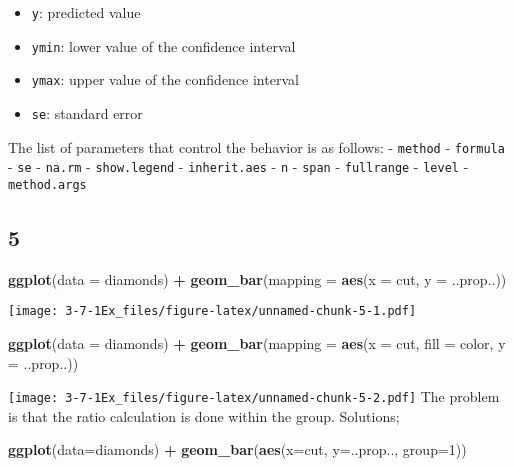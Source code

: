 \documentclass[]{article}
\newenvironment{Shaded}{\begin{snugshade}}{\end{snugshade}}
\newcommand{\DataTypeTok}[1]{\textcolor[rgb]{0.13,0.29,0.53}{#1}}
\newcommand{\DecValTok}[1]{\textcolor[rgb]{0.00,0.00,0.81}{#1}}
\newcommand{\KeywordTok}[1]{\textcolor[rgb]{0.13,0.29,0.53}{\textbf{#1}}}
\newcommand{\NormalTok}[1]{#1}
\newcommand{\OperatorTok}[1]{\textcolor[rgb]{0.81,0.36,0.00}{\textbf{#1}}}
\newcommand{\StringTok}[1]{\textcolor[rgb]{0.31,0.60,0.02}{#1}}
\providecommand{\tightlist}{%
  \setlength{\itemsep}{0pt}\setlength{\parskip}{0pt}}
\begin{document}
\begin{itemize}
\tightlist
\item
  \texttt{y}: predicted value
\item
  \texttt{ymin}: lower value of the confidence interval
\item
  \texttt{ymax}: upper value of the confidence interval
\item
  \texttt{se}: standard error
\end{itemize}

The list of parameters that control the behavior is as follows: -
\texttt{method} - \texttt{formula} - \texttt{se} - \texttt{na.rm} -
\texttt{show.legend} - \texttt{inherit.aes} - \texttt{n} - \texttt{span}
- \texttt{fullrange} - \texttt{level} - \texttt{method.args}

\hypertarget{section-5}{%
\subsection{5}\label{section-5}}

\begin{Shaded}
\begin{Highlighting}[]
\KeywordTok{ggplot}\NormalTok{(}\DataTypeTok{data =}\NormalTok{ diamonds) }\OperatorTok{+}\StringTok{ }
\StringTok{  }\KeywordTok{geom_bar}\NormalTok{(}\DataTypeTok{mapping =} \KeywordTok{aes}\NormalTok{(}\DataTypeTok{x =}\NormalTok{ cut, }\DataTypeTok{y =}\NormalTok{ ..prop..))}
\end{Highlighting}
\end{Shaded}

\texttt{[image: 3-7-1Ex\_files/figure-latex/unnamed-chunk-5-1.pdf]}

\begin{Shaded}
\begin{Highlighting}[]
\KeywordTok{ggplot}\NormalTok{(}\DataTypeTok{data =}\NormalTok{ diamonds) }\OperatorTok{+}\StringTok{ }
\StringTok{  }\KeywordTok{geom_bar}\NormalTok{(}\DataTypeTok{mapping =} \KeywordTok{aes}\NormalTok{(}\DataTypeTok{x =}\NormalTok{ cut, }\DataTypeTok{fill =}\NormalTok{ color, }\DataTypeTok{y =}\NormalTok{ ..prop..))}
\end{Highlighting}
\end{Shaded}

\texttt{[image: 3-7-1Ex\_files/figure-latex/unnamed-chunk-5-2.pdf]} The
problem is that the ratio calculation is done within the group.
Solutions;

\begin{Shaded}
\begin{Highlighting}[]
\KeywordTok{ggplot}\NormalTok{(}\DataTypeTok{data=}\NormalTok{diamonds) }\OperatorTok{+}\StringTok{ }
\StringTok{    }\KeywordTok{geom_bar}\NormalTok{(}\KeywordTok{aes}\NormalTok{(}\DataTypeTok{x=}\NormalTok{cut, }\DataTypeTok{y=}\NormalTok{..prop.., }\DataTypeTok{group=}\DecValTok{1}\NormalTok{))}
\end{Highlighting}
\end{Shaded}
\end{document}
